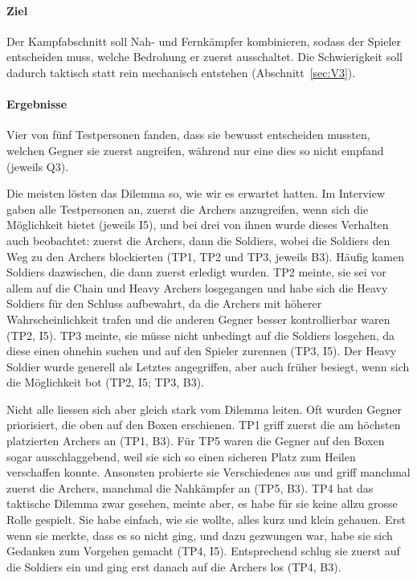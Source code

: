 \documentclass[../Main.tex]{subfiles}
\begin{document}
\paragraph{Ziel}
Der Kampfabschnitt soll Nah- und Fernkämpfer kombinieren, sodass der Spieler entscheiden muss, welche Bedrohung er zuerst ausschaltet. Die Schwierigkeit soll dadurch taktisch statt rein mechanisch entstehen (Abschnitt~\ref{sec:V3}).

\paragraph{Ergebnisse}
Vier von fünf Testpersonen fanden, dass sie bewusst entscheiden mussten, welchen Gegner sie zuerst angreifen, während nur eine dies so nicht empfand (jeweils Q3).

Die meisten lösten das Dilemma so, wie wir es erwartet hatten. Im Interview gaben alle Testpersonen an, zuerst die Archers anzugreifen, wenn sich die Möglichkeit bietet (jeweils I5), und bei drei von ihnen wurde dieses Verhalten auch beobachtet: zuerst die Archers, dann die Soldiers, wobei die Soldiers den Weg zu den Archers blockierten (TP1, TP2 und TP3, jeweils B3). Häufig kamen Soldiers dazwischen, die dann zuerst erledigt wurden. TP2 meinte, sie sei vor allem auf die Chain und Heavy Archers losgegangen und habe sich die Heavy Soldiers für den Schluss aufbewahrt, da die Archers mit höherer Wahrscheinlichkeit trafen und die anderen Gegner besser kontrollierbar waren (TP2, I5). TP3 meinte, sie müsse nicht unbedingt auf die Soldiers losgehen, da diese einen ohnehin suchen und auf den Spieler zurennen (TP3, I5). Der Heavy Soldier wurde generell als Letztes angegriffen, aber auch früher besiegt, wenn sich die Möglichkeit bot (TP2, I5; TP3, B3).

Nicht alle liessen sich aber gleich stark vom Dilemma leiten. Oft wurden Gegner priorisiert, die oben auf den Boxen erschienen. TP1 griff zuerst die am höchsten platzierten Archers an (TP1, B3). Für TP5 waren die Gegner auf den Boxen sogar ausschlaggebend, weil sie sich so einen sicheren Platz zum Heilen verschaffen konnte. Ansonsten probierte sie Verschiedenes aus und griff manchmal zuerst die Archers, manchmal die Nahkämpfer an (TP5, B3). TP4 hat das taktische Dilemma zwar gesehen, meinte aber, es habe für sie keine allzu grosse Rolle gespielt. Sie habe einfach, wie sie wollte, alles kurz und klein gehauen. Erst wenn sie merkte, dass es so nicht ging, und dazu gezwungen war, habe sie sich Gedanken zum Vorgehen gemacht (TP4, I5). Entsprechend schlug sie zuerst auf die Soldiers ein und ging erst danach auf die Archers los (TP4, B3).
\end{document}
